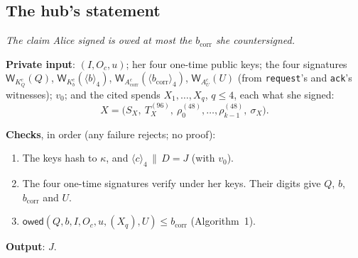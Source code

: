 \documentclass[11pt]{article}
\theoremstyle{plain}
\theoremstyle{definition}
\newcommand{\bcorr}{b_{\mathrm{corr}}}
\newcommand{\tx}[1]{\texttt{#1}}
\newcommand{\be}[2]{\langle #1\rangle_{#2}}
\newcommand{\Wots}{\mathsf{W}}
\newcommand{\owed}{\mathsf{owed}}
\newcommand{\Oc}{O_c}
\newcommand{\KQ}{K_{Q}^{c}}
\newcommand{\Kb}{K_{b}^{c}}
\newcommand{\Acorr}{A_{\mathrm{corr}}^{c}}
\newcommand{\AU}{A_{U}^{c}}
\begin{document}
\subsection{The hub's statement}\label{sec:statement}

\emph{The claim Alice signed is owed at most the $\bcorr$ she
countersigned.}

\textbf{Private input}: $(I, \Oc, u)$; her four one-time public keys;
the four signatures $\Wots_{\KQ}(Q)$, $\Wots_{\Kb}(\be{b}{4})$,
$\Wots_{\Acorr}(\be{\bcorr}{4})$, $\Wots_{\AU}(U)$ (from \tx{request}'s
and \tx{ack}'s witnesses); $v_0$; and the cited spends $X_1, \dots,
X_q$, $q \le 4$, each what she signed:
\[
  X = \big(S_X,\ T_X^{(96)},\ \rho_0^{(48)}, \dots, \rho_{k-1}^{(48)},\
  \sigma_X\big).
\]

\textbf{Checks}, in order (any failure rejects; no proof):
\begin{enumerate}[nosep]
\item The keys hash to $\kappa$, and $\be{c}{4} \,\|\, D = J$ (with $v_0$).
\item The four one-time signatures verify under her keys. Their digits
  give $Q$, $b$, $\bcorr$ and $U$.
\item $\owed(Q, b, I, \Oc, u, (X_q), U) \le \bcorr$ (Algorithm~1).
\end{enumerate}
\textbf{Output}: $J$.
\end{document}
